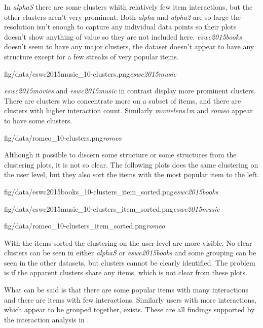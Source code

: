 \FloatBarrier

In \textit{alphaS} there are some clusters whith relatively few item interactions, but the other clusters aren't very prominent. Both \textit{alpha} and \textit{alpha2} are so large the resolution isn't enough to capture any individual data points so their plots doesn't show anything of value so they are not included here.
\textit{eswc2015books} doesn't seem to have any major clusters, the dataset doesn't appear to have any structure except for a few streaks of very popular items.

{fig/data/eswc2015music_10-clusters.png}{\textit{eswc2015music}}

\textit{eswc2015movies} and \textit{eswc2015music} in contrast display more prominent clusters. There are clusters who concentrate more on a subset of items, and there are clusters with higher interaction count.  Similarly \textit{movielens1m} and \textit{romeo} appear to have some clusters.

{fig/data/romeo_10-clusters.png}{\textit{romeo}}

\FloatBarrier

Although it possible to discern some structure or some structures from the clustering plots, it is not so clear. The following plots does the same clustering on the user level, but they also sort the items with the most popular item to the left.

\FloatBarrier

{fig/data/eswc2015books_10-clusters_item_sorted.png}{\textit{eswc2015books}}

{fig/data/eswc2015music_10-clusters_item_sorted.png}{\textit{eswc2015music}}

{fig/data/romeo_10-clusters_item_sorted.png}{\textit{romeo}}

\FloatBarrier

With the items sorted the clustering on the user level are more visible. No clear clusters can be seen in either \textit{alphaS} or \textit{eswc2015books} and some grouping can be seen in the other datasets, but clusters cannot be clearly identified. The problem is if the apparent clusters share any items, which is not clear from these plots.

What can be said is that there are some popular items with many interactions and there are items with few interactions. Similarly users with more interactions, which appear to be grouped together, exists. These are all findings supported by the interaction analysis in .

